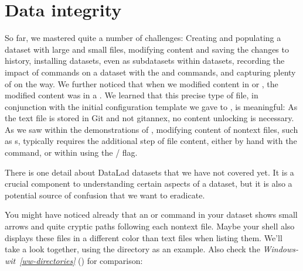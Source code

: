 \section{Data integrity}
\label{\detokenize{basics/101-115-symlinks:data-integrity}}\label{\detokenize{basics/101-115-symlinks:symlink}}\label{\detokenize{basics/101-115-symlinks:id1}}\label{\detokenize{basics/101-115-symlinks:index-0}}\label{\detokenize{basics/101-115-symlinks::doc}}
\sphinxAtStartPar
So far, we mastered quite a number of challenges:
Creating and populating a dataset with large and small files, modifying content and saving the changes to history, installing datasets, even as subdatasets within datasets, recording the impact of commands on a dataset with the  and  commands, and capturing plenty of {\hyperref[\detokenize{glossary:term-provenance}]{}} on the way.
We further noticed that when we modified content in  or , the modified content was in a .
We learned that this precise type of file, in conjunction with the initial configuration template  we gave to , is meaningful:
As the text file is stored in Git and not git\sphinxhyphen{}annex, no content unlocking is necessary.
As we saw within the demonstrations of , modifying content of non\sphinxhyphen{}text files, such as s, typically requires the additional step of  file content, either by hand with the  command, or within  using the / flag.

\sphinxAtStartPar
There is one detail about DataLad datasets that we have not covered yet.
It is a crucial component to understanding certain aspects of a dataset, but it is also a potential source of confusion that we want to eradicate.

\sphinxAtStartPar
You might have noticed already that an  or  command in your dataset shows small arrows and quite cryptic paths following each non\sphinxhyphen{}text file.
Maybe your shell also displays these files in a different color than text files when listing them.
We’ll take a look together, using the  directory as an example.
Also check the \textit{Windows-wit}~{\windowswiticoninline}\textit{\ref{ww-directories}} {\hyperref[\detokenize{basics/101-115-symlinks:ww-directories}]{}} () for comparison:

